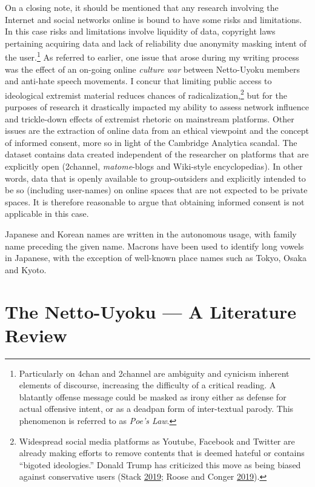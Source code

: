 \documentclass[10pt,british,A4paper,,openany]{memoir}
\begin{document}
On a closing note, it should be mentioned that any research involving
the Internet and social networks online is bound to have some risks and
limitations. In this case risks and limitations involve liquidity of
data, copyright laws pertaining acquiring data and lack of reliability
due anonymity masking intent of the user.\footnote{Particularly on 4chan
  and 2channel are ambiguity and cynicism inherent elements of
  discourse, increasing the difficulty of a critical reading. A
  blatantly offense message could be masked as irony either as defense
  for actual offensive intent, or as a deadpan form of inter-textual
  parody. This phenomenon is referred to as \emph{Poe's Law}.} As
referred to earlier, one issue that arose during my writing process was
the effect of an on-going online \emph{culture war} between Netto-Uyoku
members and anti-hate speech movements. I concur that limiting public
access to ideological extremist material reduces chances of
radicalization,\footnote{Widespread social media platforms as Youtube,
  Facebook and Twitter are already making efforts to remove contents
  that is deemed hateful or contains ``bigoted ideologies.'' Donald
  Trump has criticized this move as being biased against conservative
  users (Stack \protect\hyperlink{ref-stack_trump_2019}{2019}; Roose and
  Conger \protect\hyperlink{ref-roose_youtube_2019}{2019}).} but for the
purposes of research it drastically impacted my ability to assess
network influence and trickle-down effects of extremist rhetoric on
mainstream platforms. Other issues are the extraction of online data
from an ethical viewpoint and the concept of informed consent, more so
in light of the Cambridge Analytica scandal. The dataset contains data
created independent of the researcher on platforms that are explicitly
open (2channel, \emph{matome}-blogs and Wiki-style encyclopedias). In
other words, data that is openly available to group-outsiders and
explicitly intended to be so (including user-names) on online spaces
that are not expected to be private spaces. It is therefore reasonable
to argue that obtaining informed consent is not applicable in this case.

Japanese and Korean names are written in the autonomous usage, with
family name preceding the given name. Macrons have been used to identify
long vowels in Japanese, with the exception of well-known place names
such as Tokyo, Osaka and Kyoto.

\newpage

\chapter{The Netto-Uyoku --- A Literature
Review}\label{the-netto-uyoku-a-literature-review}
\end{document}
